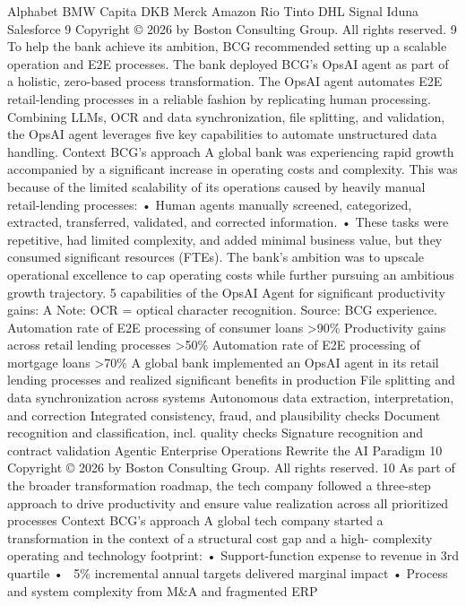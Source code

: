 Alphabet
BMW
Capita
DKB
Merck
Amazon
Rio Tinto
DHL
Signal Iduna
Salesforce
9
Copyright © 2026 by Boston Consulting Group. All rights reserved.
9
To help the bank achieve its ambition, BCG recommended setting
up a scalable operation and E2E processes. The bank deployed
BCG’s OpsAI agent as part of a holistic, zero-based process
transformation. The OpsAI agent automates E2E retail-lending
processes in a reliable fashion by replicating human
processing. Combining LLMs, OCR and data synchronization,
file splitting, and validation, the OpsAI agent leverages five key
capabilities to automate unstructured data handling.
Context
BCG's approach
A global bank was experiencing
rapid growth accompanied by a
significant increase in operating
costs and complexity. This was
because of the limited scalability of
its operations caused by heavily
manual retail-lending processes:
• Human agents manually
screened, categorized, extracted,
transferred, validated, and
corrected information.
• These tasks were repetitive, had
limited complexity, and added
minimal business value, but they
consumed significant resources
(FTEs).
The bank’s ambition was to upscale
operational excellence to cap
operating costs while further
pursuing an ambitious growth
trajectory.
5 capabilities of the OpsAI Agent for significant productivity gains:
A
Note: OCR = optical character recognition.
Source: BCG experience.
Automation rate of E2E
processing of consumer
loans
>90\%
Productivity gains
across retail lending
processes
>50\%
Automation rate of E2E
processing of mortgage
loans
>70\%
A global bank implemented an OpsAI agent in its retail lending processes
and realized significant benefits in production
File splitting and data synchronization across systems
Autonomous data extraction, interpretation, and correction
Integrated consistency, fraud, and plausibility checks
Document recognition and classification, incl. quality checks
Signature recognition and contract validation
Agentic Enterprise Operations Rewrite the AI Paradigm
10
Copyright © 2026 by Boston Consulting Group. All rights reserved.
10
As part of the broader transformation roadmap, the tech company
followed a three-step approach to drive productivity and
ensure value realization across all prioritized processes
Context
BCG's approach
A global tech company started a
transformation in the context of a
structural cost gap and a high-
complexity operating and
technology footprint:
• Support-function expense to
revenue in 3rd quartile
• ~5\% incremental annual targets
delivered marginal impact
• Process and system complexity
from M\&A and fragmented ERP

